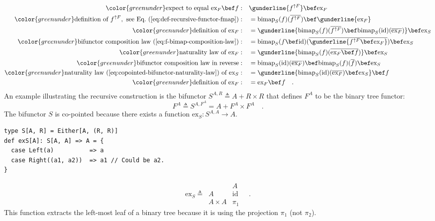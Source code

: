 \begin{align*}
{\color{greenunder}\text{expect to equal }\text{ex}_{F}\bef f:}\quad & \gunderline{f^{\uparrow F}}\bef\text{ex}_{F}\\
{\color{greenunder}\text{definition of }f^{\uparrow F},\text{ see Eq.~(\ref{eq:def-recursive-functor-fmap})}:}\quad & =\text{bimap}_{S}(f)(\overline{f^{\uparrow F}})\bef\gunderline{\text{ex}_{F}}\\
{\color{greenunder}\text{definition of }\text{ex}_{F}:}\quad & =\gunderline{\text{bimap}_{S}(f)(\overline{f^{\uparrow F}})\bef\text{bimap}_{S}(\text{id})(\overline{\text{ex}_{F}})}\bef\text{ex}_{S}\\
{\color{greenunder}\text{bifunctor composition law~(\ref{eq:f-bimap-composition-law})}:}\quad & =\text{bimap}_{S}(f\bef\text{id})(\overline{\gunderline{f^{\uparrow F}\bef\text{ex}_{F}}})\bef\text{ex}_{S}\\
{\color{greenunder}\text{naturality law of }\text{ex}_{F}:}\quad & =\gunderline{\text{bimap}_{S}(f)(\overline{\text{ex}_{F}\bef f})}\bef\text{ex}_{S}\\
{\color{greenunder}\text{bifunctor composition law in reverse}:}\quad & =\text{bimap}_{S}(\text{id})(\overline{\text{ex}_{F}})\bef\text{bimap}_{S}(f)(\overline{f})\bef\text{ex}_{S}\\
{\color{greenunder}\text{naturality law~(\ref{eq:copointed-bifunctor-naturality-law}) of }\text{ex}_{S}:}\quad & =\gunderline{\text{bimap}_{S}(\text{id})(\overline{\text{ex}_{F}})\bef\text{ex}_{S}}\bef f\\
{\color{greenunder}\text{definition of }\text{ex}_{F}:}\quad & =\text{ex}_{F}\bef f\quad.
\end{align*}
An example illustrating the recursive construction is the bifunctor
$S^{A,R}\triangleq A+R\times R$ that defines $F^{A}$ to be the binary
tree functor:
\[
F^{A}\triangleq S^{A,F^{A}}=A+F^{A}\times F^{A}\quad.
\]
The bifunctor $S$ is co-pointed because there exists a function $\text{ex}_{S}:S^{A,A}\rightarrow A$.
\begin{lstlisting}
type S[A, R] = Either[A, (R, R)]
def exS[A]: S[A, A] => A = {
  case Left(a)          => a
  case Right((a1, a2))  => a1 // Could be a2.
}
\end{lstlisting}
\[
\text{ex}_{S}\triangleq\,\begin{array}{|c||c|}
 & A\\
\hline A & \text{id}\\
A\times A & \pi_{1}
\end{array}\quad.
\]
This function extracts the left-most leaf of a binary tree because
it is using the projection $\pi_{1}$ (not $\pi_{2}$).

